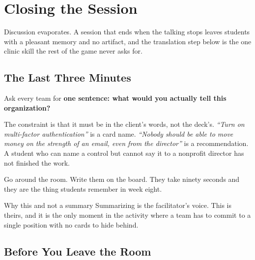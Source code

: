 \documentclass[11pt,letterpaper]{article}
\newcommand{\say}[1]{\textit{``#1''}}
\begin{document}
\section{Closing the Session}

Discussion evaporates. A session that ends when the talking stops leaves
students with a pleasant memory and no artifact, and the translation step
below is the one clinic skill the rest of the game never asks for.

\subsection{The Last Three Minutes}

Ask every team for \textbf{one sentence: what would you actually tell this
organization?}

The constraint is that it must be in the client's words, not the deck's.
\say{Turn on multi-factor authentication} is a card name. \say{Nobody should be
able to move money on the strength of an email, even from the director} is a
recommendation. A student who can name a control but cannot say it to a nonprofit
director has not finished the work.

Go around the room. Write them on the board. They take ninety seconds and they
are the thing students remember in week eight.

\begin{note}{Why this and not a summary}
Summarizing is the facilitator's voice. This is theirs, and it is the only
moment in the activity where a team has to commit to a single position with no
cards to hide behind.
\end{note}

\subsection{Before You Leave the Room}
\end{document}
